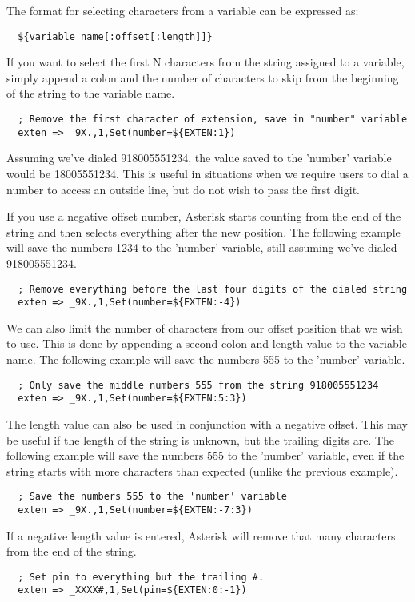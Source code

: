 The format for selecting characters from a variable can be expressed as:
\begin{verbatim}
  ${variable_name[:offset[:length]]}
\end{verbatim}
If you want to select the first N characters from the string assigned
to a variable, simply append a colon and the number of characters to
skip from the beginning of the string to the variable name.
\begin{verbatim}
  ; Remove the first character of extension, save in "number" variable
  exten => _9X.,1,Set(number=${EXTEN:1})
\end{verbatim}
Assuming we've dialed 918005551234, the value saved to the 'number' variable
would be 18005551234. This is useful in situations when we require users to 
dial a number to access an outside line, but do not wish to pass the first 
digit.

If you use a negative offset number, Asterisk starts counting from the end 
of the string and then selects everything after the new position. The following
example will save the numbers 1234 to the 'number' variable, still assuming
we've dialed 918005551234.
\begin{verbatim}
  ; Remove everything before the last four digits of the dialed string
  exten => _9X.,1,Set(number=${EXTEN:-4})
\end{verbatim}
We can also limit the number of characters from our offset position that we
wish to use. This is done by appending a second colon and length value to the
variable name. The following example will save the numbers 555 to the 'number'
variable.
\begin{verbatim}
  ; Only save the middle numbers 555 from the string 918005551234
  exten => _9X.,1,Set(number=${EXTEN:5:3})
\end{verbatim}
The length value can also be used in conjunction with a negative offset. This
may be useful if the length of the string is unknown, but the trailing digits
are. The following example will save the numbers 555 to the 'number' variable,
even if the string starts with more characters than expected (unlike the
previous example).
\begin{verbatim}
  ; Save the numbers 555 to the 'number' variable
  exten => _9X.,1,Set(number=${EXTEN:-7:3})
\end{verbatim}
If a negative length value is entered, Asterisk will remove that many characters
from the end of the string.
\begin{verbatim}
  ; Set pin to everything but the trailing #.
  exten => _XXXX#,1,Set(pin=${EXTEN:0:-1})
\end{verbatim}

